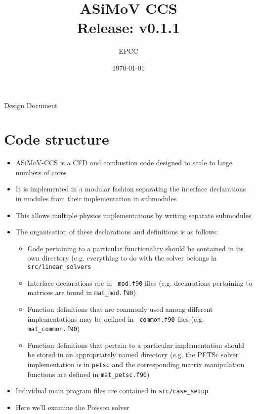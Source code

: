 \documentclass[11pt]{article}
\begin{document}
\lstset{style=codefragment}


\title{ASiMoV CCS\\\small{Release: v0.1.1}}

\date{\today}
\author{EPCC}

\makeEPCCtitle

\centerline{\sc Design Document}

\tableofcontents
\pagebreak

\bigskip


\bigskip

\section{Code structure}

\begin{itemize}
  \item ASiMoV-CCS is a CFD and combustion code designed to scale to large numbers of cores
  \item It is implemented in a modular fashion separating the interface declarations in modules from their implementation in submodules
  \item This allows multiple physics implementations by writing separate submodules
  \item The organisation of these declarations and definitions is as follows:
  \begin{itemize}
    \item Code pertaining to a particular functionality should be contained in its own directory (e.g. everything to do with the solver belongs in \texttt{src/linear\_solvers}
    \item Interface declarations are in \texttt{\_mod.f90} files (e.g. declarations pertaining to matrices are found in \texttt{mat\_mod.f90})
    \item Function definitions that are commonly used among different implementations may be defined in \texttt{\_common.f90} files (e.g. \texttt{mat\_common.f90})
    \item Function definitions that pertain to a particular implementation should be stored in an appropriately named directory (e.g. the PETSc solver implementation is in \texttt{petsc} and the corresponding matrix manipulation functions are defined in \texttt{mat\_petsc.f90})
  \end{itemize}
  \item Individual main program files are contained in \texttt{src/case\_setup}
  \item Here we'll examine the Poisson solver
\end{itemize}
\end{document}
